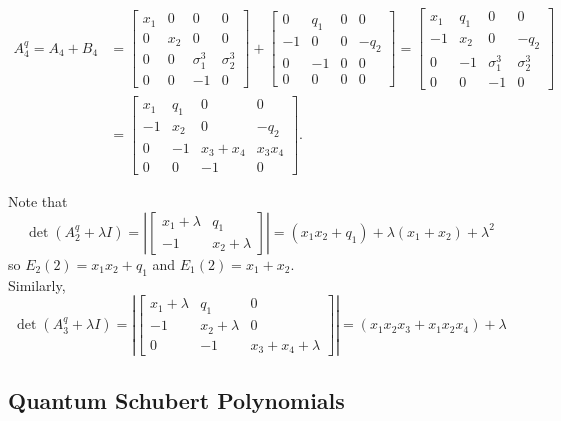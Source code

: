 \documentclass[11pt]{article}
\begin{document}
\begin{eg}
\begin{align*}
A_4^q = A_4 + B_4 &=
\begin{bmatrix}
x_1 & 0 & 0 & 0 \\
0 & x_2 & 0 & 0 \\
0 & 0 & \sigma_1^3 & \sigma_2^3 \\
0 & 0 & -1 & 0
\end{bmatrix} + 
\begin{bmatrix}
0 & q_1 & 0 & 0 \\
-1 & 0 & 0 & -q_2 \\
0 & -1 & 0 & 0 \\
0 & 0 & 0 & 0
\end{bmatrix}
=
\begin{bmatrix}
    x_1 & q_1 & 0 & 0 \\
    -1 & x_2 & 0 & -q_2 \\
    0 & -1 & \sigma_1^3 & \sigma_2^3 \\
    0 & 0 & -1 & 0
\end{bmatrix} \\
&= 
\begin{bmatrix}
    x_1 & q_1 & 0 & 0 \\
    -1 & x_2 & 0 & -q_2 \\
    0 & -1 & x_3 + x_4 & x_3x_4 \\
    0 & 0 & -1 & 0
\end{bmatrix}.
\end{align*}

Note that 
\[
    \det(A_2^q + \lambda I) = \left|
    \begin{bmatrix}
    x_1 + \lambda & q_1 \\
    -1 & x_2 + \lambda
    \end{bmatrix}
    \right| = (x_1x_2 + q_1) + \lambda(x_1 + x_2) + \lambda^2
\]
so $E_2(2) = x_1x_2 + q_1$ and $E_1(2) = x_1 + x_2$. \\

Similarly, 
\[
    \det(A_3^q + \lambda I) = \left|
    \begin{bmatrix}
    x_1 + \lambda & q_1 & 0 \\
    -1 & x_2 + \lambda & 0 \\
    0 & -1 & x_3 + x_4 + \lambda
    \end{bmatrix}
    \right| = (x_1x_2x_3 + x_1x_2x_4) + \lambda
\]

\end{eg}
\subsection{Quantum Schubert Polynomials}
\end{document}
